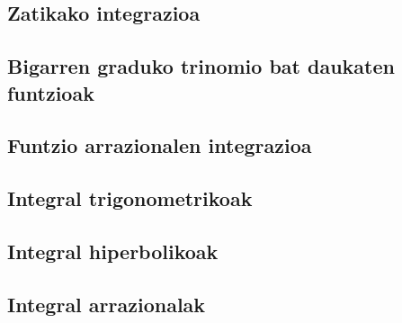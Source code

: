 \documentclass{article}
\begin{document}
		\subsection{Zatikako integrazioa}
		\subsection{Bigarren graduko trinomio bat daukaten funtzioak}
		\subsection{Funtzio arrazionalen integrazioa}
		\subsection{Integral trigonometrikoak}
		\subsection{Integral hiperbolikoak}
		\subsection{Integral arrazionalak}
\end{document}
